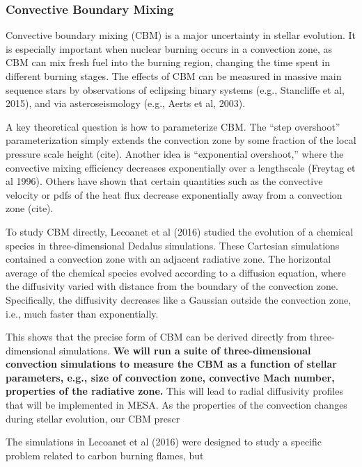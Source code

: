 {\color{purple}
\subsubsection{Convective Boundary Mixing}
}

Convective boundary mixing (CBM) is a major uncertainty in stellar evolution. It is especially important when nuclear burning occurs in a convection zone, as CBM can mix fresh fuel into the burning region, changing the time spent in different burning stages. The effects of CBM can be measured in massive main sequence stars by observations of eclipsing binary systems (e.g., Stancliffe et al, 2015), and via asteroseismology (e.g., Aerts et al, 2003).

A key theoretical question is how to parameterize CBM. The ``step overshoot'' parameterization simply extends the convection zone by some fraction of the local pressure scale height (cite). Another idea is ``exponential overshoot,'' where the convective mixing efficiency decreases exponentially over a lengthscale (Freytag et al 1996). Others have shown that certain quantities such as the convective velocity or pdfs of the heat flux decrease exponentially away from a convection zone (cite).

To study CBM directly, Lecoanet et al (2016) studied the evolution of a chemical species in three-dimensional Dedalus simulations.  These Cartesian simulations contained a convection zone with an adjacent radiative zone. The horizontal average of the chemical species evolved according to a diffusion equation, where the diffusivity varied with distance from the boundary of the convection zone. Specifically, the diffusivity decreases like a Gaussian outside the convection zone, i.e., much faster than exponentially.

This shows that the precise form of CBM can be derived directly from three-dimensional simulations. \textbf{We will run a suite of three-dimensional convection simulations to measure the CBM as a function of stellar parameters, e.g., size of convection zone, convective Mach number, properties of the radiative zone.} This will lead to radial diffusivity profiles that will be implemented in MESA. As the properties of the convection changes during stellar evolution, our CBM prescr

The simulations in Lecoanet et al (2016) were designed to study a specific problem related to carbon burning flames, but 
